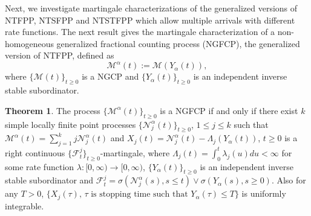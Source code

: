\documentclass[11pt,oneside,reqno]{amsart}
\theoremstyle{definition}
\newtheorem{theorem}{\bf Theorem}[section]
\theoremstyle{remarkstyle}
\begin{document}
Next, we investigate martingale characterizations of the generalized versions of NTFPP, NTSFPP and NTSTFPP which allow multiple arrivals with different rate functions. The next result gives the martingale characterization of a non-homogeneous generalized fractional counting process (NGFCP), the generalized version of NTFPP, defined as
\begin{equation}\label{definition_NGFCP}
    \mathcal{M}^{\alpha}(t):=\mathcal{M}(Y_{\alpha}(t)),
\end{equation}
where $\{\mathcal{M}(t)\}_{t\ge 0}$ is a NGCP and $\{Y_\alpha(t)\}_{t\ge 0}$ is an independent inverse stable subordinator.
\begin{theorem}\label{Watanabe_characterization_NGFCP}
    The process $\{\mathcal{M}^\alpha(t)\}_{t\ge 0}$ is a NGFCP if and only if there exist $k$ simple locally finite point processes $\{\mathcal{N}_j^\alpha(t)\}_{t\ge 0}$, $1\le j\le k$ such that $\mathcal{M}^\alpha(t)=\sum_{j=1}^{k}j\mathcal{N}_j^\alpha(t)$ and $X_j(t)=\mathcal{N}_j^\alpha(t)-\Lambda_j(Y_\alpha(t))$, $t\ge 0$ is a right continuous $\{\mathcal{F}_t^j\}_{t\ge 0}$-martingale, where $\Lambda_j(t)=\int_{0}^{t}\lambda_j(u)du<\infty$ for some rate function $\lambda:[0,\infty)\to[0,\infty)$, $\{Y_\alpha(t)\}_{t\ge 0}$ is an independent inverse stable subordinator and $\mathcal{F}_t^j=\sigma\left(\mathcal{N}_j^\alpha(s),s\le t\right)\vee\sigma\left(Y_\alpha(s),s\ge 0\right)$. Also for any $T>0$, $\{X_j(\tau),\,\tau\,\, \text{is stopping time such that}\,\,Y_{\alpha}(\tau)\le T\}$ is uniformly integrable.
\end{theorem}
\end{document}

